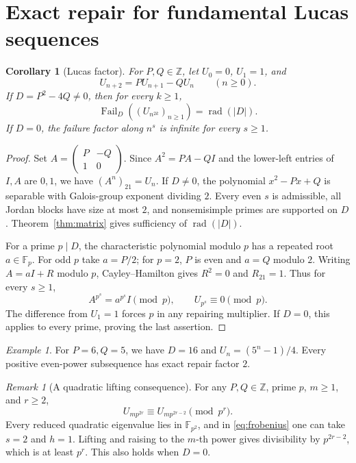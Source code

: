 \documentclass[11pt]{article}
\newtheorem{corollary}[theorem]{Corollary}
\theoremstyle{remark}
\newtheorem{remark}[theorem]{Remark}
\newtheorem{example}[theorem]{Example}
\newcommand{\rad}{\operatorname{rad}}
\newcommand{\Fail}{\operatorname{Fail}_{D}}
\newcommand{\F}{\mathbb F}
\newcommand{\Z}{\mathbb Z}
\begin{document}
\section{Exact repair for fundamental Lucas sequences}
\begin{corollary}[Lucas factor]\label{cor:lucas}
For $P,Q\in\Z$, let $U_0=0$, $U_1=1$, and
\[
 U_{n+2}=P U_{n+1}-Q U_n\qquad(n\geq0).
\]
If $D=P^2-4Q\neq0$, then for every $k\geq1$,
\[
 \Fail((U_{n^{2k}})_{n\geq1})=\rad(|D|).
\]
If $D=0$, the failure factor along $n^s$ is infinite for every $s\geq1$.
\end{corollary}
\begin{proof}
Set $A=\left(\begin{smallmatrix}P&-Q\\1&0\end{smallmatrix}\right)$. Since $A^2=PA-QI$ and the lower-left entries of $I,A$ are $0,1$, we have $(A^n)_{21}=U_n$.
If $D\neq0$, the polynomial $x^2-Px+Q$ is separable with Galois-group exponent dividing $2$. Every even $s$ is admissible, all Jordan blocks have size at most $2$, and nonsemisimple primes are supported on $D$. Theorem~\ref{thm:matrix} gives sufficiency of $\rad(|D|)$.

For a prime $p\mid D$, the characteristic polynomial modulo $p$ has a repeated root $a\in\F_p$. For odd $p$ take $a=P/2$; for $p=2$, $P$ is even and $a=Q$ modulo $2$. Writing $A=aI+R$ modulo $p$, Cayley--Hamilton gives $R^2=0$ and $R_{21}=1$. Thus for every $s\geq1$,
\[
 A^{p^s}=a^{p^s}I\pmod p,\qquad U_{p^s}\equiv0\pmod p.
\]
The difference from $U_1=1$ forces $p$ in any repairing multiplier. If $D=0$, this applies to every prime, proving the last assertion.
\end{proof}

\begin{example}
For $P=6,Q=5$, we have $D=16$ and $U_n=(5^n-1)/4$. Every positive even-power subsequence has exact repair factor $2$.
\end{example}

\begin{remark}[A quadratic lifting consequence]
For any $P,Q\in\Z$, prime $p$, $m\geq1$, and $r\geq2$,
\[
 U_{m p^{2r}}\equiv U_{m p^{2r-2}}\pmod{p^r}.
\]
Every reduced quadratic eigenvalue lies in $\F_{p^2}$, and in \eqref{eq:frobenius} one can take $s=2$ and $h=1$. Lifting and raising to the $m$-th power gives divisibility by $p^{2r-2}$, which is at least $p^r$. This also holds when $D=0$.
\end{remark}
\end{document}

